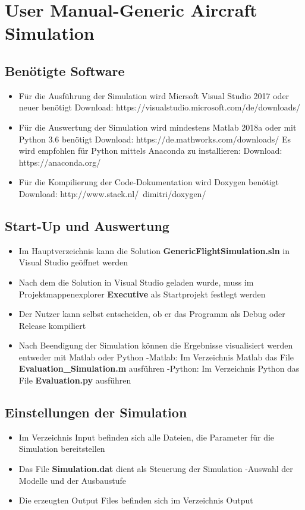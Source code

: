 \documentclass[
11pt,				%
a4paper,			%
DIV12,		     	%
liststotoc,			%
bibliography=totoc, %
listof=entryprefix, %
listot=entryprefix, %
appendixprefix=true,
pointlessnumbers,
	oneside,		%
]{scrbook}
\begin{document}
	
\chapter*{User Manual-Generic Aircraft Simulation}

\section{Benötigte Software}
\begin{itemize}
	\item Für die Ausführung der Simulation wird Micrsoft Visual Studio 2017 oder neuer benötigt
	\subitem Download: https://visualstudio.microsoft.com/de/downloads/
	\item  Für die Auswertung der Simulation wird mindestens Matlab 2018a oder  mit Python 3.6 benötigt
	\subitem Download: https://de.mathworks.com/downloads/
	\subitem Es wird empfohlen für Python mittels Anaconda zu installieren:
	\subitem Download: https://anaconda.org/
	\item Für die Kompilierung der Code-Dokumentation wird Doxygen benötigt
	\subitem Download: http://www.stack.nl/~dimitri/doxygen/
\end{itemize}
\section{Start-Up und Auswertung}
\begin{itemize}
	\item Im Hauptverzeichnis kann die Solution \textbf{GenericFlightSimulation.sln} in Visual Studio geöffnet werden
	\item Nach dem die Solution in Visual Studio geladen wurde, muss im Projektmappenexplorer \textbf{Executive} als Startprojekt festlegt werden
	\item Der Nutzer kann selbst entscheiden, ob er das Programm als Debug oder Release kompiliert
	\item Nach Beendigung der Simulation können die Ergebnisse visualisiert werden entweder mit Matlab oder Python
	\subitem -Matlab: Im Verzeichnis Matlab das File \textbf{Evaluation\_Simulation.m} ausführen
	\subitem -Python: Im Verzeichnis Python das File \textbf{Evaluation.py} ausführen
\end{itemize}
\newpage
\section{Einstellungen der Simulation}
\begin{itemize}
	\item Im Verzeichnis Input befinden sich alle Dateien, die Parameter für die Simulation bereitstellen
	\item Das File \textbf{Simulation.dat} dient als Steuerung der Simulation
	\subitem -Auswahl der Modelle und der Ausbaustufe
	\item Die erzeugten Output Files befinden sich im Verzeichnis Output
\end{itemize}
\end{document}
